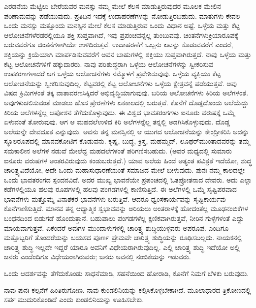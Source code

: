 ಎರಡನೆಯ ಮೆಟ್ಟಿಲು ಬೇರೆಯವರ ಮನಸ್ಸು ನಮ್ಮ ಮೇಲೆ ಕೆಲಸ ಮಾಡುತ್ತಿರುವುದರ ಮೂಲಕ ಮೇಲಿನ ಪರಿಣಾಮವನ್ನು ಪಡೆಯುವುದು. ಪ್ರತಿದಿನ ಇದಕ್ಕೆ ಉದಾಹರಣೆಗಳನ್ನು ನೋಡುತ್ತಿರಬಹುದು. ಮಾತುಗಳು ಕೇವಲ ಒಂದು ಮನಸ್ಸು ಮತ್ತೊಂದು ಮನಸ್ಸಿನ ಮೇಲೆ ಕೆಲಸ ಮಾಡುತ್ತಿರುವ ಒಂದು ವಿಧಾನ ಅಷ್ಟೆ. ಒಳ್ಳೆಯ ಮತ್ತು ಕೆಟ್ಟ ಆಲೋಚನೆ\-ಗಳೆರಡರಲ್ಲಿಯೂ ಶಕ್ತಿ ಸುಪ್ತವಾಗಿದೆ, ಇವು ಪ್ರಪಂಚವನ್ನೆಲ್ಲ ತುಂಬುವವು. ಚಿಂತನೆಗಳು\break ಕ್ರಿಯಾರೂಪಕ್ಕೆ ಬರುವವರೆಗೂ ಚಿಂತನೆಗಳಾಗಿಯೇ ಉಳಿದಿರುತ್ತವೆ. ಉದಾಹರಣೆಗೆ ಒಬ್ಬನು ಏಟನ್ನು ಕೊಡುವವರೆಗೆ ಎಂದರೆ, ಶಕ್ತಿಯನ್ನು ಕ್ರಿಯೆಯಾಗಿ ಮಾರ್ಪಡಿಸುವವರೆಗೆ ಅವನ ಬಾಹುಗಳಲ್ಲಿ ಶಕ್ತಿಯು ಸುಪ್ತವಾಗಿರುತ್ತದೆ. ನಾವು ಒಳ್ಳೆಯ ಮತ್ತು ಕೆಟ್ಟ ಆಲೋಚನೆಗಳಿಗೆ ಹಕ್ಕುದಾರರು. ನಾವು ಪರಿಶುದ್ಧರಾಗಿ ಒಳ್ಳೆಯ ಆಲೋಚನೆಗಳನ್ನು ಸ್ವೀಕರಿಸುವ ಉಪಕರಣಗಳಾದರೆ ಆಗ ಒಳ್ಳೆಯ ಆಲೋಚನೆಗಳು ನಮ್ಮೊಳಗೆ ಪ್ರವೇಶಿಸುವುವು. ಒಳ್ಳೆಯ ವ್ಯಕ್ತಿಯು ಕೆಟ್ಟ ಆಲೋಚನೆಯನ್ನು ಸ್ವೀಕರಿಸುವುದಿಲ್ಲ. ಕೆಟ್ಟವರಲ್ಲಿ ಕೆಟ್ಟ ಆಲೋಚನೆ\break ಗಳು ಒಳ್ಳೆಯ ಕ್ಷೇತ್ರವನ್ನೆ ಪಡೆಯುತ್ತವೆ. ಅವು ವಿಷದ ಕ್ರಿಮಿಗಳಂತೆ ತಕ್ಕ ವಾತಾವರಣ\break ಸಿಕ್ಕಿದರೆ ಅಭಿವೃದ್ಧಿಯಾಗುವುವು. ಬರಿಯ ಆಲೋಚನೆಗಳು ಕಿರಿಯ ಅಲೆಗಳಂತೆ. ಅವುಗಳು\break ಚಲಿಸುವಂತೆ ಮಾಡಲು ಹೊಸ ಪ್ರೇರಣೆಗಳು ಏಕಕಾಲದಲ್ಲಿ ಬರುತ್ತವೆ. ಕೊನೆಗೆ ದೊಡ್ಡದೊಂದು ಅಲೆಯೆದ್ದು ಕಿರಿಯ ಅಲೆಗಳನ್ನೆಲ್ಲ ಆಪೋಶನ ತೆಗೆದುಕೊಳ್ಳುವುದು. ಈ ವಿಶ್ವದ ಭಾವತರಂಗಗಳು ಐನೂರು ವರುಷಕ್ಕೆ ಒಮ್ಮೆ ಏಳುವಂತೆ ತೋರುವುವು. ಆಗ ಆ ಮಹದಲೆ\break ಉಳಿದ ಕಿರಿ ಅಲೆಗಳನ್ನೆಲ್ಲ ತನ್ನಲ್ಲಿ ಅಡಗಿಸಿಕೊಳ್ಳುವುದು. ದೊಡ್ಡ ಅಲೆಯನ್ನೇ ದೇವದೂತ ಎನ್ನುವುದು. ಅವನು ತನ್ನ ಮನಸ್ಸಿನಲ್ಲಿ ಆ ಯುಗದ ಆಲೋಚನೆಯನ್ನು ಕೇಂದ್ರೀಕರಿಸಿ ಅದನ್ನು ಸ್ಥೂಲರೂಪದಲ್ಲಿ ಮಾನವಕೋಟಿಗೆ ಕೊಡುವನು. ಕೃಷ್ಣ, ಬುದ್ಧ, ಕ್ರಿಸ್ತ, ಮಹಮ್ಮದ್​, ಲೂಥರ್​ ಮುಂತಾದವರನ್ನು ತಮ್ಮ ಸಮಕಾಲೀನ ಅಲೆಗಳ ನಡುವೆ ಮೇಲೆದ್ದ ಮಹದಲೆಗಳಂತೆ ಪರಿಗಣಿಸಬಹುದು. (ಅವರ ಮಧ್ಯದಲ್ಲಿ ಸುಮಾರು ಐನೂರು ವರುಷಗಳ ಅಂತರವಿರುವುದು ಕಂಡುಬರುತ್ತದೆ.) ಯಾವ ಅಲೆಯ ಹಿಂದೆ ಅತ್ಯಂತ ಪವಿತ್ರತೆ ಇದೆಯೋ, ಶುದ್ಧ ಚಾರಿತ್ರ್ಯವಿದೆಯೋ, ಅದೇ ಒಂದು ಮಹಾಸುಧಾರಣೆಯಂತೆ ಸಮಾಜದ ಮೇಲೆ ಬೀಳುವುದು. ಪುನಃ ನಮ್ಮ ಕಾಲದಲ್ಲೇ ಒಂದು ಭಾವತರಂಗದ ಸ್ಪಂದನವಿದೆ. ಅದರ ಮುಖ್ಯ ಭಾವನೆಯೇ ಪ್ರಪಂಚದಲ್ಲಿ ಓತಪ್ರೋತನಾದ ದೇವರು. ಅದು ಎಲ್ಲಾ ಕಡೆಗಳಲ್ಲಿಯೂ ಹಲವು ರೂಪಗಳಲ್ಲಿ ಹಲವು ಪಂಗಡಗಳಲ್ಲಿ ಕಾಣಿಸುತ್ತಿದೆ. ಈ ಅಲೆಗಳಲ್ಲಿ ಒಮ್ಮೆ ಸೃಷ್ಟಿಪರವಾದ ಭಾವನೆಗಳು ಮತ್ತೊಮ್ಮೆ ವಿನಾಶಕರ ಭಾವನೆಗಳು ಬರುತ್ತಿವೆ. ಆದರೂ ಧ್ವಂಸಕಾರ್ಯವನ್ನು ಸೃಷ್ಟಿಕಾರ್ಯವು ಕೊನೆಗಾಣಿಸುತ್ತಿದೆ. ಮಾನವ ತನ್ನ ಆಧ್ಯಾತ್ಮಿಕ ಸ್ವಭಾವವನ್ನು ಅರಿಯಲು ಅಂತರಾಳಕ್ಕೆ ಹೋದಂತೆಲ್ಲ ಮೂಢನಂಬಿಕೆಗಳ ಬಂಧನದಿಂದ ಬಿಡುಗಡೆ ಹೊಂದುತ್ತಾನೆ. ಬಹುಪಾಲು ಪಂಗಡಗಳೆಲ್ಲ ಕ್ಷಣಿಕವಾಗಿರುತ್ತವೆ, ನೀರಿನ ಗುಳ್ಳೆಗಳಂತೆ ಎದ್ದು ಮಾಯವಾಗುತ್ತವೆ. ಏಕೆಂದರೆ ಅವುಗಳ ಮುಂದಾಳುಗಳಲ್ಲಿ ಚಾರಿತ್ರ್ಯ ಶುದ್ಧಿಯುಳ್ಳವರು ಅಪರೂಪ. ಎಂದಿಗೂ ಮತ್ತೊಬ್ಬರಿಗೆ ತೊಂದರೆಯನ್ನು ಬಯಸದ ಪೂರ್ಣ ಪ್ರೇಮವೇ ಚಾರಿತ್ರ್ಯ ಶುದ್ಧಿಯನ್ನು ರೂಢಿಸಬಲ್ಲದು. ನಾಯಕನಲ್ಲಿ ಚಾರಿತ್ರ್ಯ ಶುದ್ಧಿ ಇಲ್ಲದೇ ಇದ್ದರೆ ಯಾರೂ ಅವನಿಗೆ ವಿಧೇಯರಾಗಿರುವುದಿಲ್ಲ. ಎಲ್ಲಿ ಚಾರಿತ್ರ್ಯ ಶುದ್ಧಿ ಇದೆಯೋ ಅಲ್ಲಿ ಜನರು ಎಂದೆಂದಿಗೂ ವಿಧೇಯರಾಗಿರುವರು; ಜನರು ಅವನಲ್ಲಿ ನಂಬಿಕೆಯನ್ನು ಇಡುವರು.

ಒಂದು ಆದರ್ಶವನ್ನು ತೆಗೆದುಕೊಂಡು ಸಾಧನೆಮಾಡಿ, ಸಹನೆಯಿಂದ ಹೋರಾಡಿ, ಕೊನೆಗೆ ನಿಮಗೆ ಬೆಳಕು ಬರುವುದು.

\delimiter

ನಾವು ಪುನಃ ಕಲ್ಪನೆಗೆ ಹಿಂತಿರುಗೋಣ. ನಾವು ಕುಂಡಲಿನಿಯನ್ನು ಕಲ್ಪಿಸಿಕೊಳ್ಳಬೇಕಾಗಿದೆ. ಮೂಲಾಧಾರದ ತ್ರಿಕೋಣದಲ್ಲಿ ಸರ್ಪ ಮುದುರಿಕೊಂಡಿದೆ ಎಂದು ಕುಂಡಲಿನಿಯನ್ನು ಊಹಿಸಬೇಕು.

